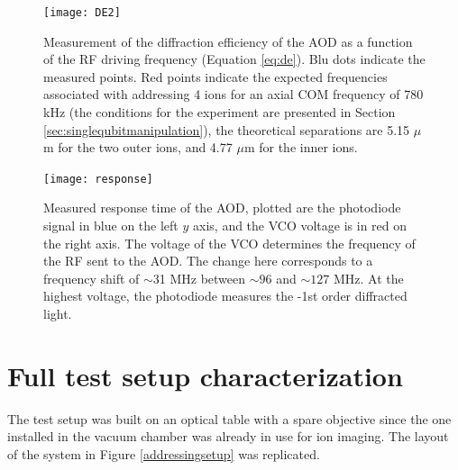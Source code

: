 \begin{figure}
\centering
\texttt{[image: DE2]}
\caption{Measurement of the diffraction efficiency of the AOD as a function of the RF driving frequency (Equation \eqref{eq:de}). Blu dots indicate the measured points. Red points indicate the expected frequencies associated with addressing 4 ions for an axial COM frequency of 780 kHz (the conditions for the experiment are presented in Section \ref{sec:singlequbitmanipulation}), the theoretical separations are 5.15 $\mu$m for the two outer ions, and 4.77 $\mu$m for the inner ions.}
\label{DE}
\end{figure}

\begin{figure}
\centering
\texttt{[image: response]}
\caption{Measured response time of the AOD, plotted are the photodiode signal in blue on the left $y$ axis, and the VCO voltage is in red on the right axis. The voltage of the VCO determines the frequency of the RF sent to the AOD. The change here corresponds to a frequency shift of $\sim$31 MHz between $\sim 96$ and $\sim 127$ MHz. At the highest voltage, the photodiode measures the -1st order diffracted light.}
\label{response}
\end{figure}

\section{Full test setup characterization}
\label{sec:fullsetup}
The test setup was built on an optical table with a spare objective since the one installed in the vacuum chamber was already in use for ion imaging. The layout of the system in Figure \ref{addressingsetup} was replicated.

